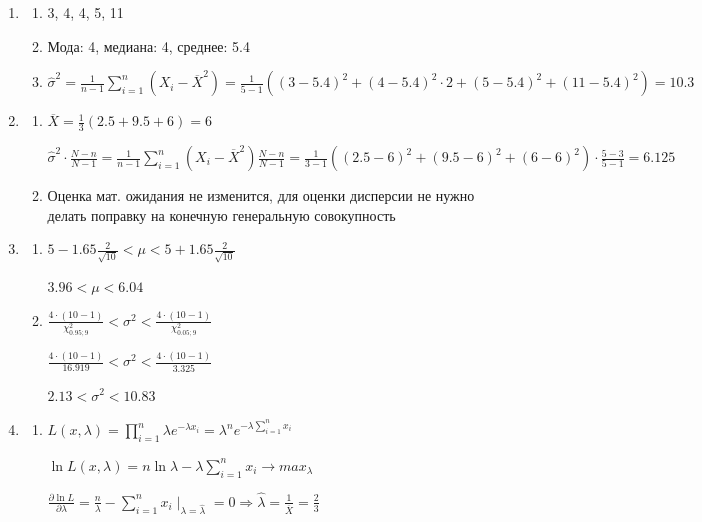 \documentclass[12pt, a4paper]{article}\usepackage[]{graphicx}\usepackage[]{color}
\begin{document}
\begin{enumerate}

	\item
		\begin{enumerate}
			\item 3, 4, 4, 5, 11
			\item Мода: 4, медиана: 4, среднее: 5.4
			\item $\hat{\sigma}^2 = \frac{1}{n-1} \sum_{i=1}^{n} \left(X_i - \overline{X}^2 \right) = \frac{1}{5-1} \left( (3-5.4)^2 + (4-5.4)^2 \cdot 2 + (5-5.4)^2 + (11-5.4)^2 \right) = 10.3 $
		\end{enumerate}

	\item
		\begin{enumerate}
			\item $\overline{X} = \frac{1}{3} (2.5 + 9.5 + 6) = 6$

			$\hat{\sigma}^2 \cdot \frac{N-n}{N-1} = \frac{1}{n-1} \sum_{i=1}^{n} \left(X_i - \overline{X}^2 \right) \frac{N-n}{N-1} = \frac{1}{3-1} ( (2.5-6)^2 + (9.5-6)^2 + (6-6)^2 ) \cdot \frac{5-3}{5-1} = 6.125$

			\item Оценка мат. ожидания не изменится, для оценки дисперсии не нужно делать поправку на конечную генеральную совокупность
		\end{enumerate}

	\item
		\begin{enumerate}
			\item $5 - 1.65 \frac{2}{\sqrt{10}} < \mu < 5 + 1.65 \frac{2}{\sqrt{10}}$

					 $ 3.96 < \mu < 6.04$
			\item $\frac{4\cdot(10-1)}{\chi^2_{0.95; 9}} < \sigma^2 < \frac{4\cdot(10-1)}{\chi^2_{0.05; 9}}  $

					 $\frac{4\cdot(10-1)}{16.919} < \sigma^2 < \frac{4\cdot(10-1)}{3.325}  $

			        $2.13 < \sigma^2 < 10.83$
		\end{enumerate}

	\item
		\begin{enumerate}
			\item $L(x, \lambda) = \prod_{i=1}^n \lambda e^{-\lambda x_i} = \lambda^n e^{-\lambda \sum_{i=1}^n x_i} $

			$\ln L(x, \lambda) = n \ln \lambda - \lambda \sum_{i=1}^n x_i \to max_\lambda $

			$ \frac{\partial \ln L}{\partial \lambda} = \frac{n}{\lambda} - \sum_{i=1}^n x_i \mid_{\lambda = \hat{\lambda}} =0 \Rightarrow \hat{\lambda} = \frac{1}{\overline{X}} = \frac{2}{3} $


\end{enumerate}
\end{enumerate}
\end{document}
